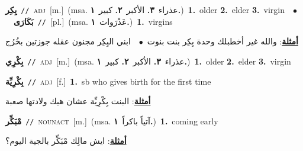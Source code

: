 \documentclass[10pt,a4paper,twoside]{article} %
\begin{document}
\begin{multicols}{2}
{\setlength\topsep{0pt}\textbf{\foreignlanguage{arabic}{بِكِر}}\ {\color{gray}\texttt{//}\color{black}}\ \textsc{adj}\ [m.]\ \color{gray}(msa. \foreignlanguage{arabic}{عذراء}~\foreignlanguage{arabic}{\textbf{٣.}}  \foreignlanguage{arabic}{الأكبر}~\foreignlanguage{arabic}{\textbf{٢.}}  \foreignlanguage{arabic}{كبير}~\foreignlanguage{arabic}{\textbf{١.}})\color{black}\ \textbf{1.}~older  \textbf{2.}~elder  \textbf{3.}~virgin\ \ $\bullet$\ \ \setlength\topsep{0pt}\textbf{\foreignlanguage{arabic}{بَكَارَى}}\ {\color{gray}\texttt{//}\color{black}}\ [pl.]\ \color{gray}(msa. \foreignlanguage{arabic}{عَذْرَوات}~\foreignlanguage{arabic}{\textbf{١.}})\color{black}\ \textbf{1.}~virgins\  \begin{flushright}\color{gray}\foreignlanguage{arabic}{\textbf{\underline{\foreignlanguage{arabic}{أمثلة}}}: والله غير أخطبلك وحدة بِكِر بنت بنوت\ $\bullet$\ \  ابني البِكِر مجنون عقله جوزتين بخُرُج}\end{flushright}\color{black}} \vspace{2mm}

{\setlength\topsep{0pt}\textbf{\foreignlanguage{arabic}{بِكْرِي}}\ {\color{gray}\texttt{//}\color{black}}\ \textsc{adj}\ [m.]\ \color{gray}(msa. \foreignlanguage{arabic}{عذراء}~\foreignlanguage{arabic}{\textbf{٣.}}  \foreignlanguage{arabic}{الأكبر}~\foreignlanguage{arabic}{\textbf{٢.}}  \foreignlanguage{arabic}{كبير}~\foreignlanguage{arabic}{\textbf{١.}})\color{black}\ \textbf{1.}~older  \textbf{2.}~elder  \textbf{3.}~virgin\ } \vspace{2mm}

{\setlength\topsep{0pt}\textbf{\foreignlanguage{arabic}{بِكْرِيِّة}}\ {\color{gray}\texttt{//}\color{black}}\ \textsc{adj}\ [f.]\ \textbf{1.}~sb who gives birth for the first time\  \begin{flushright}\color{gray}\foreignlanguage{arabic}{\textbf{\underline{\foreignlanguage{arabic}{أمثلة}}}: البنت بِكْرِيِّة عشان هيك ولادتها صعبة}\end{flushright}\color{black}} \vspace{2mm}

{\setlength\topsep{0pt}\textbf{\foreignlanguage{arabic}{مْبَكِّر}}\ {\color{gray}\texttt{//}\color{black}}\ \textsc{noun\textunderscore act}\ [m.]\ \color{gray}(msa. \foreignlanguage{arabic}{آتياً باكراً}~\foreignlanguage{arabic}{\textbf{١.}})\color{black}\ \textbf{1.}~coming early\  \begin{flushright}\color{gray}\foreignlanguage{arabic}{\textbf{\underline{\foreignlanguage{arabic}{أمثلة}}}: ايش مالِك مْبَكِّر بالجية اليوم؟}\end{flushright}\color{black}} \vspace{2mm}


\end{multicols}
\end{document}

